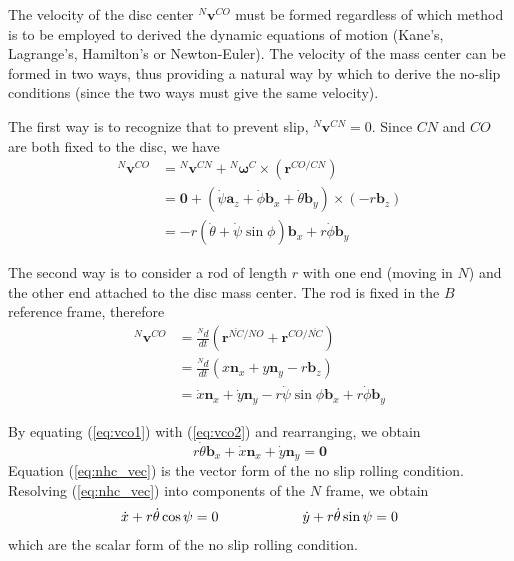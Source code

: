\documentclass[letterpaper,11pt]{article}
\newcommand{\bs}[1]{\boldsymbol{#1}}
\begin{document}
The velocity of the disc center ${}^N\bs{v}^{CO}$ must be formed regardless of
which method is to be employed to derived the dynamic equations of motion
(Kane's, Lagrange's, Hamilton's or Newton-Euler).  The velocity
of the mass center can be formed in two ways, thus providing a natural way by
which to derive the no-slip conditions (since the two ways must give the same
velocity).

The first way is to recognize that to prevent slip, ${}^N\bs{v}^{CN} = 0$.
Since $CN$ and $CO$ are both fixed to the disc, we have
\begin{align}
    {}^N\bs{v}^{CO} &= {}^N\bs{v}^{CN} + {}^N\bs{\omega}^C \times
    (\bs{r}^{CO/CN}) \nonumber \\
    &= \bs{0} + (\dot{\psi} \bs{a}_z + \dot{\phi} \bs{b}_x
    + \dot{\theta} \bs{b}_y) \times (-r\bs{b}_z) \nonumber \\
  &= -r(\dot{\theta} + \dot{\psi}\sin{\phi})\bs{b}_x
     + r\dot{\phi}\bs{b}_y 
  \label{eq:vco1}
\end{align}

The second way is to consider a rod of length $r$ with one end  (moving in $N$)
and the other end attached to the disc mass center.  The rod is fixed in the
$B$ reference frame, therefore
\begin{align}
    {}^N\bs{v}^{CO} &= \frac{ {}^Nd}{dt}(\bs{r}^{\overline{NC}/NO}
    + \bs{r}^{CO/\overline{NC}}) \nonumber \\
    &= \frac{ {}^Nd}{dt}(x\bs{n}_x + y\bs{n}_y - r \bs{b}_z) \nonumber \\
                  &=  \dot{x} \bs{n}_x + \dot{y} \bs{n}_y - r\dot{\psi}\sin{\phi}\bs{b}_x + r\dot{\phi}\bs{b}_y
  \label{eq:vco2}
\end{align}

By equating (\ref{eq:vco1}) with (\ref{eq:vco2}) and rearranging, we obtain
\begin{equation}
  r\dot{\theta}\bs{b}_x + \dot{x} \bs{n}_x + \dot{y} \bs{n}_y = \bs{0}
  \label{eq:nhc_vec}
\end{equation}
Equation (\ref{eq:nhc_vec}) is the vector form of the no slip rolling
condition.  Resolving (\ref{eq:nhc_vec}) into components of the $N$ frame, we
obtain
\begin{equation}
  \begin{tabular}{ccccccc}
  $\dot{x} + r\dot{\theta}\cos{\psi} = 0$ & & & & &
  $\dot{y} + r\dot{\theta}\sin{\psi} = 0$
  \end{tabular}
  \label{eq:nhc_scalar}
\end{equation}
which are the scalar form of the no slip rolling condition.
\end{document}
